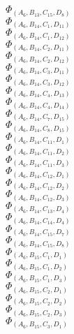\documentclass[14pt]{article}
\begin{document}
    $\Phi_{({A}_{6}, {B}_{13}, {C}_{15}, {D}_{8})}$ \\ 
    $\Phi_{({A}_{6}, {B}_{14}, {C}_{1}, {D}_{11})}$ \\ 
    $\Phi_{({A}_{6}, {B}_{14}, {C}_{1}, {D}_{12})}$ \\ 
    $\Phi_{({A}_{6}, {B}_{14}, {C}_{2}, {D}_{11})}$ \\ 
    $\Phi_{({A}_{6}, {B}_{14}, {C}_{2}, {D}_{12})}$ \\ 
    $\Phi_{({A}_{6}, {B}_{14}, {C}_{3}, {D}_{11})}$ \\ 
    $\Phi_{({A}_{6}, {B}_{14}, {C}_{3}, {D}_{12})}$ \\ 
    $\Phi_{({A}_{6}, {B}_{14}, {C}_{4}, {D}_{13})}$ \\ 
    $\Phi_{({A}_{6}, {B}_{14}, {C}_{4}, {D}_{14})}$ \\ 
    $\Phi_{({A}_{6}, {B}_{14}, {C}_{7}, {D}_{15})}$ \\ 
    $\Phi_{({A}_{6}, {B}_{14}, {C}_{8}, {D}_{15})}$ \\ 
    $\Phi_{({A}_{6}, {B}_{14}, {C}_{11}, {D}_{1})}$ \\ 
    $\Phi_{({A}_{6}, {B}_{14}, {C}_{11}, {D}_{2})}$ \\ 
    $\Phi_{({A}_{6}, {B}_{14}, {C}_{11}, {D}_{3})}$ \\ 
    $\Phi_{({A}_{6}, {B}_{14}, {C}_{12}, {D}_{1})}$ \\ 
    $\Phi_{({A}_{6}, {B}_{14}, {C}_{12}, {D}_{2})}$ \\ 
    $\Phi_{({A}_{6}, {B}_{14}, {C}_{12}, {D}_{3})}$ \\ 
    $\Phi_{({A}_{6}, {B}_{14}, {C}_{13}, {D}_{4})}$ \\ 
    $\Phi_{({A}_{6}, {B}_{14}, {C}_{14}, {D}_{4})}$ \\ 
    $\Phi_{({A}_{6}, {B}_{14}, {C}_{15}, {D}_{7})}$ \\ 
    $\Phi_{({A}_{6}, {B}_{14}, {C}_{15}, {D}_{8})}$ \\ 
    $\Phi_{({A}_{6}, {B}_{15}, {C}_{1}, {D}_{1})}$ \\ 
    $\Phi_{({A}_{6}, {B}_{15}, {C}_{1}, {D}_{2})}$ \\ 
    $\Phi_{({A}_{6}, {B}_{15}, {C}_{1}, {D}_{3})}$ \\ 
    $\Phi_{({A}_{6}, {B}_{15}, {C}_{2}, {D}_{1})}$ \\ 
    $\Phi_{({A}_{6}, {B}_{15}, {C}_{2}, {D}_{2})}$ \\ 
    $\Phi_{({A}_{6}, {B}_{15}, {C}_{2}, {D}_{3})}$ \\ 
    $\Phi_{({A}_{6}, {B}_{15}, {C}_{3}, {D}_{1})}$ \\ 
\end{document}
